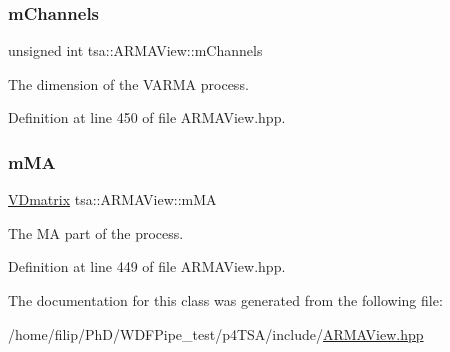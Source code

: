 \subsubsection{\texorpdfstring{m\+Channels}{mChannels}}
{\footnotesize\ttfamily unsigned int tsa\+::\+A\+R\+M\+A\+View\+::m\+Channels\hspace{0.3cm}{\ttfamily [private]}}



The dimension of the V\+A\+R\+MA process. 



Definition at line 450 of file A\+R\+M\+A\+View.\+hpp.

\mbox{\label{classtsa_1_1_a_r_m_a_view_a420b5083584d78e4bb7f5db8b3e62bc3}} 
\subsubsection{\texorpdfstring{m\+MA}{mMA}}
{\footnotesize\ttfamily \hyperlink{namespacetsa_a6dd7105c3202ef00a213d7c029f5b248}{V\+Dmatrix} tsa\+::\+A\+R\+M\+A\+View\+::m\+MA\hspace{0.3cm}{\ttfamily [private]}}



The MA part of the process. 



Definition at line 449 of file A\+R\+M\+A\+View.\+hpp.



The documentation for this class was generated from the following file\+:\begin{DoxyCompactItemize}
\item 
/home/filip/\+Ph\+D/\+W\+D\+F\+Pipe\+\_\+test/p4\+T\+S\+A/include/\hyperlink{_a_r_m_a_view_8hpp}{A\+R\+M\+A\+View.\+hpp}\end{DoxyCompactItemize}
